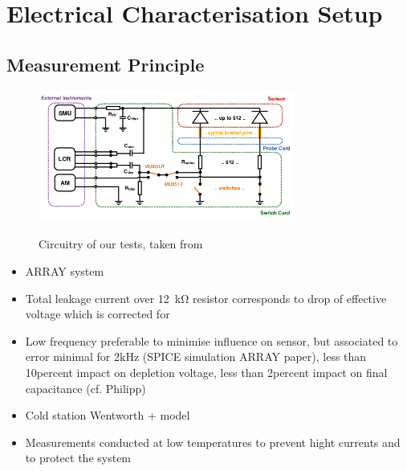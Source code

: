 \section{Electrical Characterisation Setup}
\label{sec:setup}

\subsection{Measurement Principle}
\label{subsec:setup_principle}
\begin{figure}[h]
	\centering
	\includegraphics[width=0.75\textwidth]{figures/circuit_cards_updated.png}
	\label{fig:switchprobecard_CAD}
	\caption{
		Circuitry of our tests, taken from~\cite{pitters:array2019}
	}
\end{figure}


\begin{itemize}
	\item ARRAY system~\cite{pitters:array2019}
	\item Total leakage current over \SI{12}{\kilo\ohm} resistor corresponds to drop of effective voltage which is corrected for
	\item Low frequency preferable to minimise influence on sensor, but associated to error minimal for 2kHz (SPICE simulation ARRAY paper), less than 10percent impact on depletion voltage, less than 2percent impact on final capacitance (cf. Philipp)
\end{itemize}

\begin{itemize}
	\item Cold station Wentworth + model
	\item Measurements conducted at low temperatures to prevent hight currents and to protect the system
\end{itemize}




